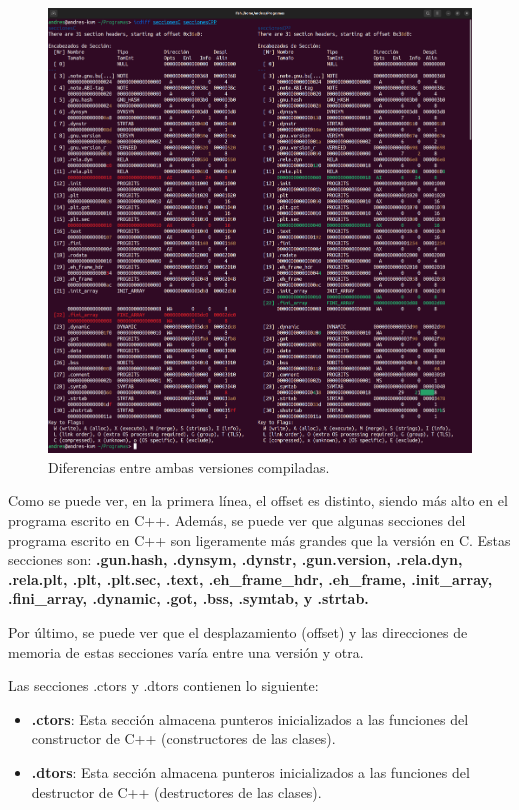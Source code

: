 \documentclass{article}
\begin{document}
\begin{figure}[H]
    \includegraphics[width=\textwidth]{imagenes/icdiff/mergedicdiff.png}
    \caption{Diferencias entre ambas versiones compiladas.}
\end{figure}

Como se puede ver, en la primera línea, el offset es distinto, siendo más alto en el programa escrito en C++. Además, se puede ver que algunas secciones del programa escrito en C++ son ligeramente más grandes que la versión en C. Estas secciones son: \textbf{.gun.hash, .dynsym, .dynstr, .gun.version, .rela.dyn, .rela.plt, .plt, .plt.sec, .text, .eh\_frame\_hdr, .eh\_frame, .init\_array, .fini\_array, .dynamic, .got, .bss, .symtab, y .strtab.}

\bigskip

Por último, se puede ver que el desplazamiento (offset) y las direcciones de memoria de estas secciones varía entre una versión y otra.


\bigskip

Las secciones .ctors y .dtors contienen lo siguiente:

\begin{itemize}
    \item \textbf{.ctors}: Esta sección almacena punteros inicializados a las funciones del constructor de C++ (constructores de las clases).
    \item \textbf{.dtors}: Esta sección almacena punteros inicializados a las funciones del destructor de C++ (destructores de las clases).
\end{itemize}
\end{document}
